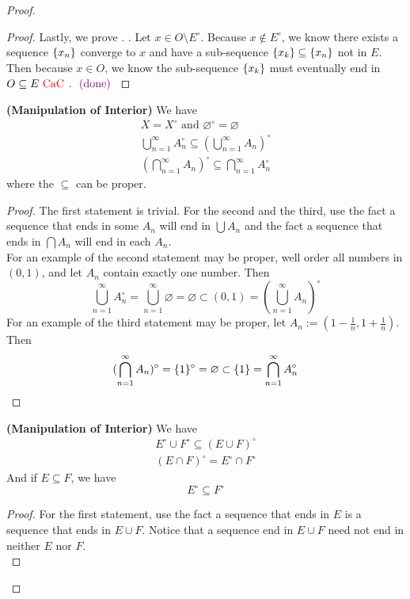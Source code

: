 \documentclass{report}
\begin{document}
\begin{proof}
\begin{proof}
Lastly, we prove . . Let $x\in O\setminus E^\circ $. Because $x\not\in E^\circ $, we know there exists a sequence $\{ x_n \}$ converge to $x$ and have a sub-sequence  $\{ x_k \}\subseteq \{ x_n \}$ not in $E$. Then because $x\in O$, we know the sub-sequence $\{ x_k \}$ must eventually end in $O\subseteq E\text{ \textcolor{red}{CaC} }$. $\textcolor{violet}{\text{ (done) }}$
\end{proof}
\begin{theorem}
\label{3.3.3}
\textbf{(Manipulation of Interior)} We have
\begin{gather}
X=X^\circ\text{ and }\varnothing^\circ =\varnothing\\
\bigcup_{n=1}^\infty A_n^\circ \subseteq (\bigcup_{n=1}^\infty A_n)^\circ\\
(\bigcap _{n=1}^\infty A_n)^\circ \subseteq \bigcap _{n=1}^\infty A_n^\circ 
\end{gather}
where the $\subseteq$ can be proper.
\end{theorem}
\begin{proof}
The first statement is trivial. For the second and the third, use the fact a sequence that ends in  some $A_n$ will end in  $\bigcup A_n$ and the fact a sequence that ends in $\bigcap A_n$ will end in each $A_n$.\\

For an example of the second statement may be proper, well order all numbers in $(0,1)$, and let $A_n$ contain exactly one number. Then
\begin{equation}
\bigcup_{n=1}^\infty A_n^\circ=\bigcup_{n=1}^\infty \varnothing=\varnothing \subset (0,1)=(\bigcup_{n=1}^\infty A_n)^\circ 
\end{equation}
For an example of the third statement may be proper, let $A_n:=(1-\frac{1}{n},1+\frac{1}{n})$. Then
\begin{equation}
  (\bigcap _{n=1}^\infty A_n)^\circ =\{ 1 \}^\circ =\varnothing \subset \{ 1 \}=\bigcap_{n=1}^\infty A_n^\circ 
\end{equation}
\end{proof}
\begin{theorem}
\label{3.3.4}
\textbf{(Manipulation of Interior)} We have
\begin{gather}
E^\circ \cup F^\circ\subseteq (E\cup F)^\circ\\
(E\cap F)^\circ = E^\circ \cap F^\circ 
\end{gather}
And if $E\subseteq F$, we have
\begin{equation}
E^\circ \subseteq F^\circ 
\end{equation}
\end{theorem}
\begin{proof}
For the first statement, use the fact a sequence that ends in $E$ is a sequence that ends in $E\cup F$. Notice that a sequence end in $E\cup F$ need not end in neither $E$ nor  $F$.\\


\end{proof}
\end{proof}
\end{document}
